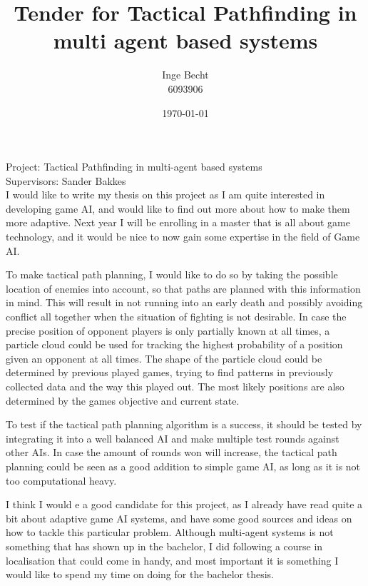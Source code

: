 \documentclass{article}
\title{Tender for Tactical Pathfinding in multi agent based systems}
\author{Inge Becht \\6093906}
\date{\today}
\begin{document}
\maketitle
Project: Tactical Pathfinding in multi-agent based systems\\
Supervisors: Sander Bakkes\\

I would like to write my thesis on this project as I am quite interested in developing game AI, and would like to find out more about how to make them more adaptive. Next year I will be enrolling in a master that is all about game technology, and it would be nice to now gain some expertise in the field of Game AI.

To make tactical path planning, I would like to do so by taking the possible location of enemies into account, so that paths are planned with this information in mind. This will result in not running into an early death and possibly avoiding conflict all together when the situation of fighting is not desirable. In case the precise position of opponent players is only partially known at all times, a particle cloud could be used for tracking the highest probability of a position given an opponent at all times. The shape of the particle cloud could be determined by previous played games, trying to find patterns in previously collected data and the way this played out. The most likely positions are also determined by the games objective and current state.

To test if the tactical path planning algorithm is a success, it should be tested by integrating it into a well balanced AI and make multiple test rounds against other AIs. In case the amount of rounds won will increase, the tactical path planning could be seen as a good addition to simple game AI, as long as it is not too computational heavy.  

I think I would e a good candidate for this project, as I already have read quite a bit about adaptive game AI systems, and have some good sources and ideas on how to tackle this particular problem. Although multi-agent systems is not something that has shown up in the bachelor, I did following a course in localisation that could come in handy, and most important it is something I would like to spend my time on doing for the bachelor thesis.
\end{document}
